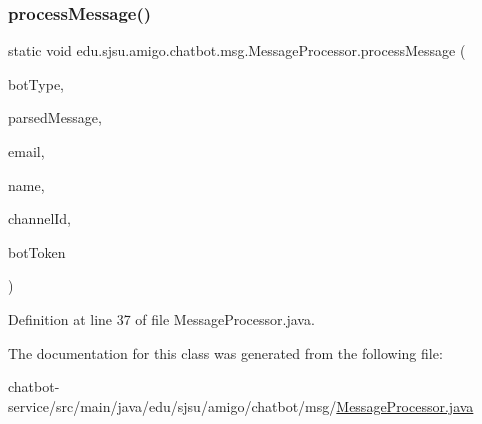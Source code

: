 \subsubsection{\texorpdfstring{process\+Message()}{processMessage()}}
{\footnotesize\ttfamily static void edu.\+sjsu.\+amigo.\+chatbot.\+msg.\+Message\+Processor.\+process\+Message (\begin{DoxyParamCaption}\item[{\hyperlink{enumedu_1_1sjsu_1_1amigo_1_1mp_1_1util_1_1_bot_type}{Bot\+Type}}]{bot\+Type,  }\item[{String}]{parsed\+Message,  }\item[{String}]{email,  }\item[{String}]{name,  }\item[{String}]{channel\+Id,  }\item[{String}]{bot\+Token }\end{DoxyParamCaption})\hspace{0.3cm}{\ttfamily [static]}}



Definition at line 37 of file Message\+Processor.\+java.



The documentation for this class was generated from the following file\+:\begin{DoxyCompactItemize}
\item 
chatbot-\/service/src/main/java/edu/sjsu/amigo/chatbot/msg/\hyperlink{_message_processor_8java}{Message\+Processor.\+java}\end{DoxyCompactItemize}
